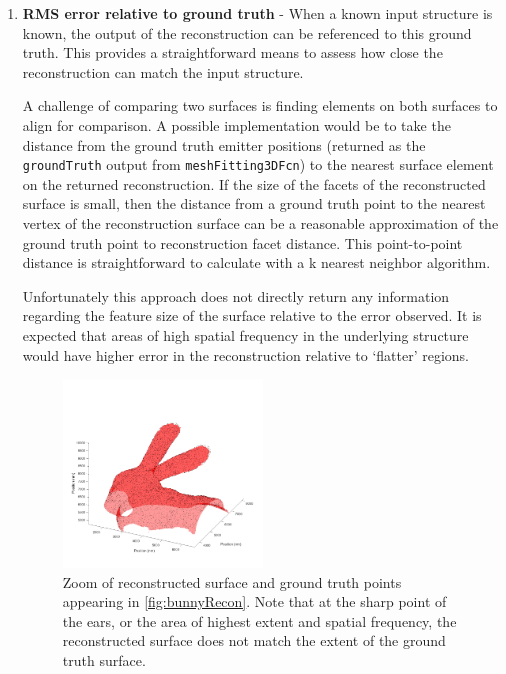 \documentclass[10pt,a4paper]{article}
\begin{document}
\begin{enumerate}
	\item \textbf{RMS error relative to ground truth} - When a known input structure is known, the output of the reconstruction can be referenced to this ground truth. This provides a straightforward means to assess how close the reconstruction can match the input structure.  
	
	A challenge of comparing two surfaces is finding elements on both surfaces to align for comparison.  A possible implementation would be to take the distance from the ground truth emitter positions (returned as the \texttt{groundTruth} output from \texttt{meshFitting3DFcn}) to the nearest surface element on the returned reconstruction.  If the size of the facets of the reconstructed surface is small, then the distance from a ground truth point to the nearest vertex of the reconstruction surface can be a reasonable approximation of the ground truth point to reconstruction facet distance.  This point-to-point distance is straightforward to calculate with a k nearest neighbor algorithm. 
		
	Unfortunately this approach does not directly return any information regarding the feature size of the surface relative to the error observed. It is expected that areas of high spatial frequency in the underlying structure would have higher error in the reconstruction relative to `flatter' regions. 
	
	\begin{figure}
		\centering
		\includegraphics[width=0.5\textwidth]{./figures/bunnyReconEars.png}
		\caption[Step3]{Zoom of reconstructed surface and ground truth points appearing in \ref{fig:bunnyRecon}.  Note that at the sharp point of the ears, or the area of highest extent and spatial frequency, the reconstructed surface does not match the extent of the ground truth surface.}
		\label{fig:bunnyReconModulation}
	\end{figure}
	

\end{enumerate}
\end{document}
